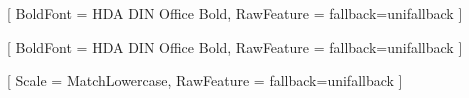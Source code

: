 \usepackage{polyglossia} %
\setmainlanguage{german}
\usepackage{microtype} %
\usepackage{amsmath} %

\usepackage{fontspec}
\usepackage{unicode-math}
\usepackage{luacode}

\usepackage{tikz}
\usepackage{tikz-3dplot}
\usetikzlibrary{arrows.meta,calc,arrows,3d,bending,positioning}


%

\setmainfont{HDA DIN Office}[
  BoldFont   = {HDA DIN Office Bold},
  RawFeature = {fallback=unifallback}
]

\setsansfont{HDA DIN Office}[
  BoldFont   = {HDA DIN Office Bold},
  RawFeature = {fallback=unifallback}
]

\setmonofont{DejaVu Sans Mono}[
  Scale      = MatchLowercase,
  RawFeature = {fallback=unifallback}
]


\usepackage[a4paper,margin=2.5cm]{geometry}
\setlength{\parskip}{0.5\baselineskip}
\setlength{\parindent}{0pt}

\usepackage{fancyhdr}
\pagestyle{fancy}
\fancyhf{} %

\fancyfoot[C]{\thepage} %

